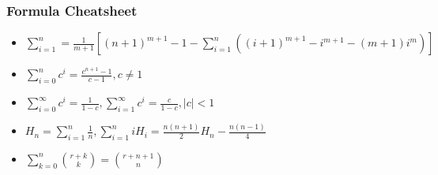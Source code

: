 \subsubsection{Formula Cheatsheet}
\vspace{2.5mm}
\begin{itemize}
    \item $\sum\limits_{i=1}^n = \frac{1}{m+1}[(n+1)^{m+1} - 1 - \sum\limits_{i=1}^n((i+1)^{m+1}-i^{m+1}-(m+1)i^m)]$

    \item $\sum\limits_{i=0}^nc^i = \frac{c^{n+1}-1}{c-1}, c\neq 1$

    \item $\sum\limits_{i=0}^\infty c^i = \frac{1}{1-c}, \sum\limits_{i=1}^\infty c^i = \frac{c}{1-c}, |c|< 1$

    \item $H_n = \sum\limits_{i=1}^n \frac{1}{n}, \sum\limits_{i=1}^n iH_i = \frac{n(n+1)}{2}H_n - \frac{n(n-1)}{4}$

    \item $\sum\limits_{k=0}^n\binom{r+k}{k} =\binom{r+n+1}{n}$

\end{itemize}

